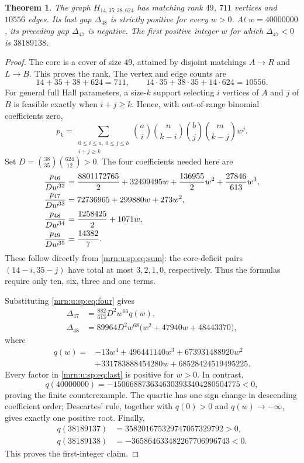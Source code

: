 \documentclass[11pt,a4paper]{article}
\newtheorem{theorem}{Theorem}[section]
\theoremstyle{remark}\newtheorem{remark}[theorem]{Remark}
\begin{document}
\begin{theorem}\label{mrn:u:sp:thm:separation}
The graph $H_{14,35;38,624}$ has matching rank $49$, $711$ vertices and $10556$ edges. Its last gap $\Delta_{48}$ is strictly positive for every $w>0$. At $w=40000000$, its preceding gap $\Delta_{47}$ is negative. The first positive integer $w$ for which $\Delta_{47}<0$ is $38189138$.
\end{theorem}

\begin{proof}
The core is a cover of size $49$, attained by disjoint matchings $A\to R$ and $L\to B$. This proves the rank. The vertex and edge counts are
\[
 14+35+38+624=711,\qquad14\cdot35+38\cdot35+14\cdot624=10556.
\]
For general full Hall parameters, a size-$k$ support selecting $i$ vertices of $A$ and $j$ of $B$ is feasible exactly when $i+j\ge k$. Hence, with out-of-range binomial coefficients zero,
\begin{equation}\label{mrn:u:sp:eq:sum}
 p_k=\sum_{\substack{0\le i\le a,\ 0\le j\le b\\i+j\ge k}}
 \binom ai\binom n{k-i}\binom bj\binom m{k-j}w^j.
\end{equation}
Set $D=\binom{38}{35}\binom{624}{12}>0$. The four coefficients needed here are
\begin{align}
 \frac{p_{46}}{Dw^{32}}
 &=\frac{8801172765}{2}+32499495w
   +\frac{136955}{2}w^2+\frac{27846}{613}w^3,\label{mrn:u:sp:eq:four}\\
 \frac{p_{47}}{Dw^{33}}&=72736965+299880w+273w^2,\notag\\
 \frac{p_{48}}{Dw^{34}}&=\frac{1258425}{2}+1071w,\notag\\
 \frac{p_{49}}{Dw^{35}}&=\frac{14382}{7}.\notag
\end{align}
These follow directly from \eqref{mrn:u:sp:eq:sum}: the core-deficit pairs $(14-i,35-j)$ have total at most $3,2,1,0$, respectively. Thus the formulas require only ten, six, three and one terms.

Substituting \eqref{mrn:u:sp:eq:four} gives
\begin{align}
 \Delta_{47}&=\frac{882}{613}D^2w^{66}q(w),\label{mrn:u:sp:eq:penultimate}\\
 \Delta_{48}&=89964D^2w^{68}\bigl(w^2+47940w+48443370\bigr),\label{mrn:u:sp:eq:last}
\end{align}
where
\begin{align*}
 q(w)={}&-13w^4+496441140w^3+673931488920w^2\\
        &+331783888454280w+68528424519495225.
\end{align*}
Every factor in \eqref{mrn:u:sp:eq:last} is positive for $w>0$. In contrast,
\[
 q(40000000)=-1506688736346303933404280504775<0,
\]
proving the finite counterexample. The quartic has one sign change in descending coefficient order; Descartes' rule, together with $q(0)>0$ and $q(w)\to-\infty$, gives exactly one positive root. Finally,
\begin{align*}
 q(38189137)&=358201675329747057329792>0,\\
 q(38189138)&=-365864633482267706996743<0.
\end{align*}
This proves the first-integer claim.
\end{proof}
\end{document}
